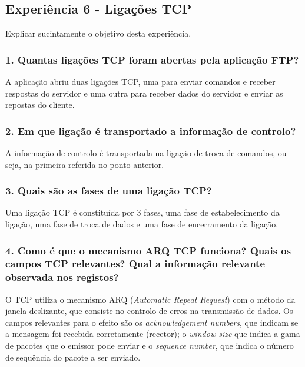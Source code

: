 \subsection*{Experiência 6 - Ligações TCP}
Explicar sucintamente o objetivo desta experiência.

\subsubsection{1. Quantas ligações TCP foram abertas pela aplicação FTP?}
A aplicação abriu duas ligações TCP, uma para enviar comandos e receber respostas do servidor e 
uma outra para receber dados do servidor e enviar as repostas do cliente.

\subsubsection{2. Em que ligação é transportado a informação de controlo?}
A informação de controlo é transportada na ligação de troca de comandos, ou seja, na primeira referida no ponto anterior.

\subsubsection{3. Quais são as fases de uma ligação TCP?}
Uma ligação TCP é constituída por 3 fases, uma fase de estabelecimento da ligação, uma fase de troca de dados e uma fase de encerramento da ligação.

\subsubsection{4. Como é que o mecanismo ARQ TCP funciona? Quais os campos TCP relevantes? Qual a informação relevante observada nos registos?}
O TCP utiliza o mecanismo ARQ (\emph{Automatic Repeat Request}) com o método da janela deslizante, que consiste no controlo de erros na transmissão de dados. 
Os campos relevantes para o efeito são os \emph{acknowledgement numbers}, que indicam se a mensagem foi recebida corretamente (recetor); o \emph{window size} que indica a gama de pacotes que o emissor pode enviar e o \emph{sequence number}, que indica o número de sequência do pacote a ser enviado.

